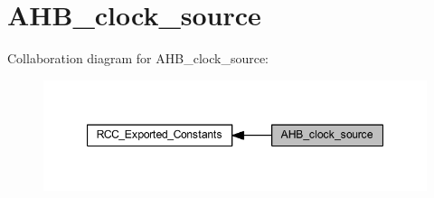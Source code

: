 \hypertarget{group___a_h_b__clock__source}{}\section{A\+H\+B\+\_\+clock\+\_\+source}
\label{group___a_h_b__clock__source}
Collaboration diagram for A\+H\+B\+\_\+clock\+\_\+source\+:
\nopagebreak
\begin{figure}[H]
\begin{center}
\leavevmode
\includegraphics[width=347pt]{group___a_h_b__clock__source}
\end{center}
\end{figure}
